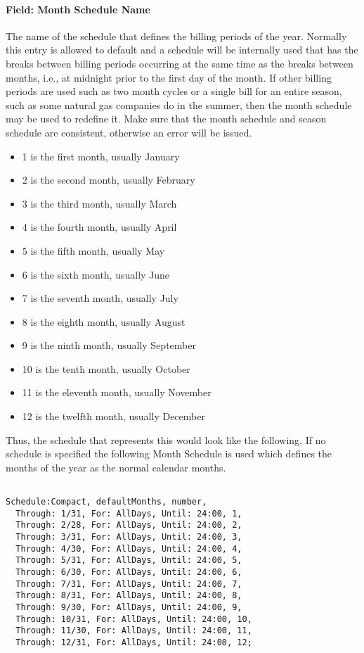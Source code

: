 \paragraph{Field: Month Schedule Name}\label{field-month-schedule-name}

The name of the schedule that defines the billing periods of the year. Normally this entry is allowed to default and a schedule will be internally used that has the breaks between billing periods occurring at the same time as the breaks between months, i.e., at midnight prior to the first day of the month. If other billing periods are used such as two month cycles or a single bill for an entire season, such as some natural gas companies do in the summer, then the month schedule may be used to redefine it. Make sure that the month schedule and season schedule are consistent, otherwise an error will be issued.

\begin{itemize}
\item
  1 is the first month, usually January
\item
  2 is the second month, usually February
\item
  3 is the third month, usually March
\item
  4 is the fourth month, usually April
\item
  5 is the fifth month, usually May
\item
  6 is the sixth month, usually June
\item
  7 is the seventh month, usually July
\item
  8 is the eighth month, usually August
\item
  9 is the ninth month, usually September
\item
  10 is the tenth month, usually October
\item
  11 is the eleventh month, usually November
\item
  12 is the twelfth month, usually December
\end{itemize}

Thus, the schedule that represents this would look like the following. If no schedule is specified the following Month Schedule is used which defines the months of the year as the normal calendar months.

\begin{lstlisting}

Schedule:Compact, defaultMonths, number,
  Through: 1/31, For: AllDays, Until: 24:00, 1,
  Through: 2/28, For: AllDays, Until: 24:00, 2,
  Through: 3/31, For: AllDays, Until: 24:00, 3,
  Through: 4/30, For: AllDays, Until: 24:00, 4,
  Through: 5/31, For: AllDays, Until: 24:00, 5,
  Through: 6/30, For: AllDays, Until: 24:00, 6,
  Through: 7/31, For: AllDays, Until: 24:00, 7,
  Through: 8/31, For: AllDays, Until: 24:00, 8,
  Through: 9/30, For: AllDays, Until: 24:00, 9,
  Through: 10/31, For: AllDays, Until: 24:00, 10,
  Through: 11/30, For: AllDays, Until: 24:00, 11,
  Through: 12/31, For: AllDays, Until: 24:00, 12;
\end{lstlisting}

